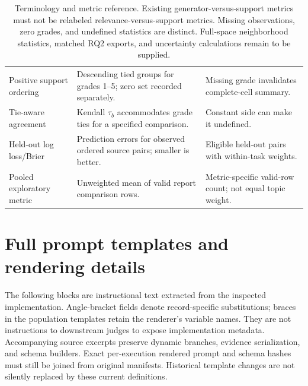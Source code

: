 \begin{table}[!htbp]
\begin{tabularx}{\textwidth}{@{}p{}Yp{.26\textwidth}@{}}
Positive support ordering & Descending tied groups for grades 1--5; zero set recorded separately. & Missing grade invalidates complete-cell summary.\\
Tie-aware agreement & Kendall $\tau_b$ accommodates grade ties for a specified comparison. & Constant side can make it undefined.\\
Held-out log loss/Brier & Prediction errors for observed ordered source pairs; smaller is better. & Eligible held-out pairs with within-task weights.\\
Pooled exploratory metric & Unweighted mean of valid report comparison rows. & Metric-specific valid-row count; not equal topic weight.\\
\bottomrule
\end{tabularx}
\caption{Terminology and metric reference. Existing generator-versus-support metrics must not be relabeled relevance-versus-support metrics. Missing observations, zero grades, and undefined statistics are distinct. Full-space neighborhood statistics, matched RQ2 exports, and uncertainty calculations remain to be supplied.}
\end{table}

\section{Full prompt templates and rendering details}
\label{app:templates}
The following blocks are instructional text extracted from the inspected implementation. Angle-bracket fields denote record-specific substitutions; braces in the population templates retain the renderer's variable names. They are not instructions to downstream judges to expose implementation metadata. Accompanying source excerpts preserve dynamic branches, evidence serialization, and schema builders. Exact per-execution rendered prompt and schema hashes must still be joined from original manifests. Historical template changes are not silently replaced by these current definitions.

